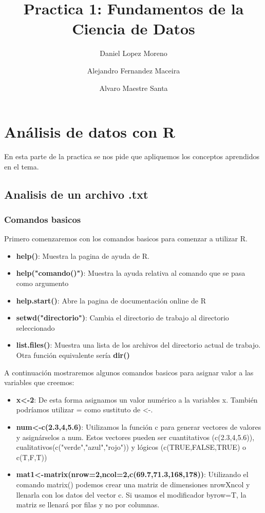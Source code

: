 \documentclass [a4paper] {article}
\title{Practica 1: Fundamentos de la Ciencia de Datos}
\author{
  Daniel Lopez Moreno\\
  \and
  Alejandro Fernandez Maceira\\
  \and
  Alvaro Maestre Santa
}
\begin{document}
\maketitle

\section{Análisis de datos con R}
En esta parte de la practica se nos pide que 
apliquemos los conceptos aprendidos en el tema.\\

\subsection{Analisis de un archivo .txt}
\subsubsection{Comandos basicos}
Primero comenzaremos con los comandos basicos para 
comenzar a utilizar R.

\begin{itemize}
\item \textbf{help()}: Muestra la pagina de ayuda de R.
\item \textbf{help("comando()")}: Muestra la ayuda relativa al comando que se 
								  pasa como argumento
\item \textbf{help.start()}: Abre la pagina de documentación online de R
\item \textbf{setwd("directorio")}: Cambia el directorio de trabajo al 
									directorio seleccionado
\item \textbf{list.files()}: Muestra una lista de los archivos del directorio
							 actual de trabajo. Otra función equivalente sería 
							 \textbf{dir()}
							 
\end{itemize}

A continuación mostraremos algunos comandos basicos para asignar valor
a las variables que creemos:

\begin{itemize}
\item \textbf{x<-2}: De esta forma asignamos un valor numérico a la variables
					 x. También podríamos utilizar = como sustituto de <-.
\item \textbf{num<-c(2.3,4,5.6)}: Utilizamos la función c para generar vectores de
								  valores y asignárselos a num. Estos vectores pueden
								  ser cuantitativos (c(2.3,4,5.6)), cualitativos(c("verde","azul","rojo"))
								  y lógicos (c(TRUE,FALSE,TRUE) o c(T,F,T))
\item \textbf{mat1<-matrix(nrow=2,ncol=2,c(69.7,71.3,168,178))}: Utilizando el comando
							matrix() podemos crear una matriz de dimensiones nrowXncol y 
							llenarla con los datos del vector c. Si usamos el modificador
							byrow=T, la matriz se llenará por filas y no por columnas.
\end{itemize}
\end{document}
